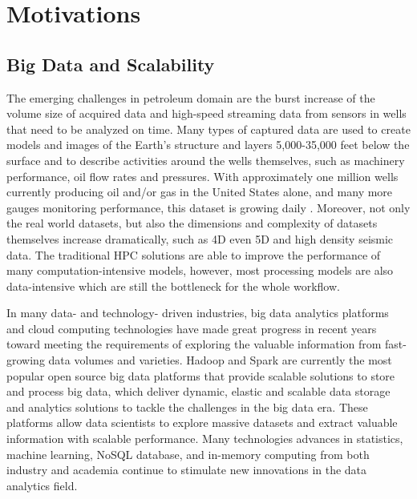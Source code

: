 \section{Motivations}

\subsection{Big Data and Scalability}

The emerging challenges in petroleum domain are the burst increase of the volume size of acquired data and high-speed streaming data from sensors in wells that need to be analyzed on time. Many types of captured data are used to create models and images of the Earth's structure and layers 5,000-35,000 feet below the surface and to describe activities around the wells themselves, such as machinery performance, oil flow rates and pressures. With approximately one million wells currently producing oil and/or gas in the United States alone, and many more gauges monitoring performance, this dataset is growing daily \cite{bigdataofindustry}. Moreover, not only the real world datasets, but also the dimensions and complexity of datasets themselves increase dramatically, such as 4D even 5D and high density seismic data. The traditional HPC solutions are able to improve the performance of many computation-intensive models, however,  most processing models are also data-intensive which are still the bottleneck for the whole workflow. 

In many data- and technology- driven industries, big data analytics platforms and cloud computing technologies have made great progress in recent years toward meeting the requirements of exploring the valuable information from fast-growing data volumes and varieties.  Hadoop and Spark are currently the most popular open source big data platforms that provide scalable solutions to store and process big data, which deliver dynamic, elastic and scalable data storage and analytics solutions to tackle the challenges in the big data era. These platforms allow data scientists to explore massive datasets and extract valuable information with scalable performance. Many technologies advances in statistics, machine learning, NoSQL database, and in-memory computing from both industry and academia continue to stimulate new innovations in the data analytics field.

